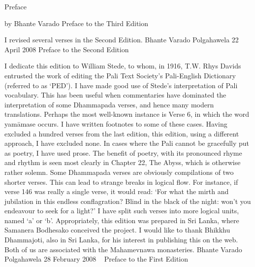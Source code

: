 
Preface

by Bhante Varado 
Preface to the Third Edition

I revised several verses in the Second Edition.
Bhante Varado
Polgahawela
22 April 2008
Preface to the Second Edition

I dedicate this edition to William Stede, to whom, in 1916, T.W. Rhys Davids entrusted the work of editing the Pali Text Society's Pali-English Dictionary (referred to as ‘PED'). I have made good use of Stede's interpretation of Pali vocabulary. This has been useful when commentaries have dominated the interpretation of some Dhammapada verses, and hence many modern translations. Perhaps the most well-known instance is Verse 6, in which the word yamāmase occurs. I have written footnotes to some of these cases.
Having excluded a hundred verses from the last edition, this edition, using a different approach, I have excluded none. In cases where the Pali cannot be gracefully put as poetry, I have used prose. The benefit of poetry, with its pronounced rhyme and rhythm is seen most clearly in Chapter 22, The Abyss, which is otherwise rather solemn.
Some Dhammapada verses are obviously compilations of two shorter verses. This can lead to strange breaks in logical flow. For instance, if verse 146 was really a single verse, it would read: ‘For what the mirth and jubilation in this endless conflagration? Blind in the black of the night: won’t you endeavour to seek for a light?’ I have split such verses into more logical units, named ‘a’ or ‘b’.
Appropriately, this edition was prepared in Sri Lanka, where Samanera Bodhesako conceived the project. I would like to thank Bhikkhu Dhammajoti, also in Sri Lanka, for his interest in publishing this on the web. Both of us are associated with the Mahamevnawa monasteries.
Bhante Varado
Polgahawela
28 February 2008
 
Preface to the First Edition

